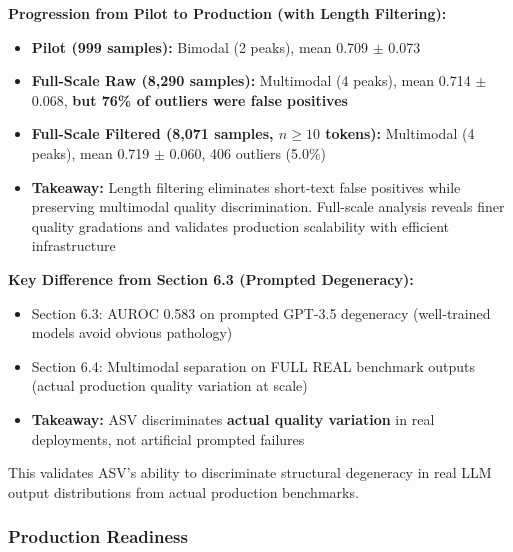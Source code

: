 \documentclass[11pt]{article}
\begin{document}
\textbf{Progression from Pilot to Production (with Length Filtering):}
\begin{itemize}
\item \textbf{Pilot (999 samples):} Bimodal (2 peaks), mean 0.709 $\pm$ 0.073
\item \textbf{Full-Scale Raw (8,290 samples):} Multimodal (4 peaks), mean 0.714 $\pm$ 0.068, \textbf{but 76\% of outliers were false positives}
\item \textbf{Full-Scale Filtered (8,071 samples, $n \geq 10$ tokens):} Multimodal (4 peaks), mean 0.719 $\pm$ 0.060, 406 outliers (5.0\%)
\item \textbf{Takeaway:} Length filtering eliminates short-text false positives while preserving multimodal quality discrimination. Full-scale analysis reveals finer quality gradations and validates production scalability with efficient infrastructure
\end{itemize}

\textbf{Key Difference from Section 6.3 (Prompted Degeneracy):}
\begin{itemize}
\item Section 6.3: AUROC 0.583 on prompted GPT-3.5 degeneracy (well-trained models avoid obvious pathology)
\item Section 6.4: Multimodal separation on FULL REAL benchmark outputs (actual production quality variation at scale)
\item \textbf{Takeaway:} ASV discriminates \textbf{actual quality variation} in real deployments, not artificial prompted failures
\end{itemize}

This validates ASV's ability to discriminate structural degeneracy in real LLM output distributions from actual production benchmarks.

\subsubsection{Production Readiness}
\end{document}
